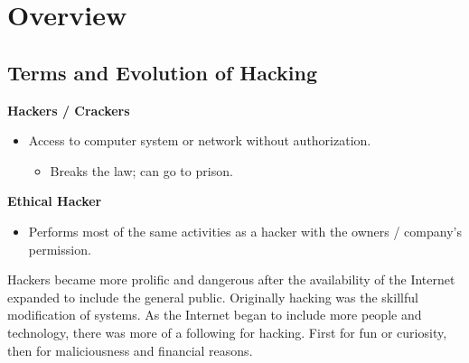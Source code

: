 \section{Overview}
\subsection{Terms and Evolution of Hacking}
\textbf{Hackers / Crackers}
\begin{itemize}
    \item Access to computer system or network without authorization.
    \begin{itemize}
        \item Breaks the law; can go to prison.
    \end{itemize}
\end{itemize}

\textbf{Ethical Hacker}
\begin{itemize}
    \item Performs most of the same activities as a hacker with the owners / company's permission.
\end{itemize}

Hackers became more prolific and dangerous after the availability of the Internet expanded to include the general public.
Originally hacking was the skillful modification of systems.
As the Internet began to include more people and technology, there was more of a following for hacking.
First for fun or curiosity, then for maliciousness and financial reasons.

